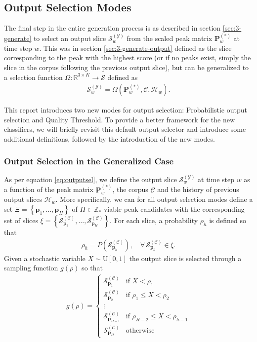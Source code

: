 \subsection{Output Selection Modes}\label{ssec:output-sel}
The final step in the entire generation process is as described in section \ref{sec:3-generate} to select an output slice $\mathcal S^{(\mathcal Y)}_w$ from the scaled peak matrix $\bm P^{(\ast)}_w$ at time step $w$. This was in section \ref{sec:3-generate-output} defined as the slice corresponding to the peak with the highest score (or if no peaks exist, simply the slice in the corpus following the previous output slice), but can be generalized to a selection function $\Omega \colon \mathbb R^{3\times K} \rightarrow \mathcal S$ defined as
	\begin{align}\label{eq:outputsel}
		\mathcal S^{(\mathcal Y)}_w = \Omega\left(\bm P^{(\ast)}_w, \mathcal C, \mathcal H_w \right).
	\end{align}

This report introduces two new modes for output selection: Probabilistic output selection and Quality Threshold. To provide a better framework for the new classifiers, we will briefly revisit this default output selector and introduce some additional definitions, followed by the introduction of the new modes.

\subsubsection{Output Selection in the Generalized Case}\label{ssec:default-outputsel}
As per equation \ref{eq:outputsel}, we define the output slice $\mathcal S^{(\mathcal Y)}_w$ at time step $w$ as a function of the peak matrix $\bm P^{(\ast)}_w$, the corpus $\mathcal C$ and the history of previous output slices $\mathcal H_w$. More specifically, we can for all output selection modes define a set $\Xi = \left\lbrace \bm p_1, \dots, \bm p_H\right\rbrace$ of $H \in \mathbb Z_{\ast}$ viable peak candidates with the corresponding set of slices $\xi =\left\lbrace \mathcal S^{(\mathcal C)}_{\bm p_1}, \dots, \mathcal S^{(\mathcal C)}_{\bm p_H}\right\rbrace$. For each slice, a probability $\rho_h$ is defined so that
	\begin{align}
		\rho_h = P\left(\mathcal S^{(\mathcal C)}_{\bm p_h}\right), \quad \forall\, \mathcal S^{(\mathcal C)}_{\bm p_h} \in \xi.
	\end{align}
	Given a stochastic variable $X \sim \text{U}[0,1]$ the output slice is selected through a sampling function $g(\rho)$ so that
	\begin{align}\label{eq:samplingproba}
		g(\rho) = \left\lbrace\begin{array}{cl}
			\mathcal S^{(\mathcal C)}_{\bm p_1} & \text{if } X < \rho_1\\
			\mathcal S^{(\mathcal C)}_{\bm p_2} & \text{if } \rho_1 \le X < \rho_2\\
			\vdots\\
			\mathcal S^{(\mathcal C)}_{\bm p_{H-1}} & \text{if } \rho_{H-2} \le X < \rho_{h-1}\\
			\mathcal S^{(\mathcal C)}_{\bm p_H} & \text{otherwise}
		\end{array}\right.
	\end{align}
	
